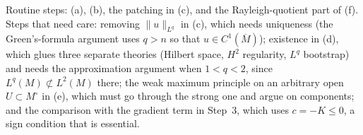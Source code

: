 \documentclass[11pt]{article}
\theoremstyle{plain}
\theoremstyle{definition}
\theoremstyle{remark}
\begin{document}
Routine steps: (a), (b), the patching in (c), and the Rayleigh-quotient part of (f). Steps that need care: removing \(\|u\|_{L^q}\) in (c), which needs uniqueness (the Green's-formula argument uses \(q>n\) so that \(u\in C^1(\overline M)\)); existence in (d), which glues three separate theories (Hilbert space, \(H^2\) regularity, \(L^q\) bootstrap) and needs the approximation argument when \(1<q<2\), since \(L^q(M)\not\subset L^2(M)\) there; the weak maximum principle on an arbitrary open \(U\subset M^\circ\) in (e), which must go through the strong one and argue on components; and the comparison with the gradient term in Step~3, which uses \(c=-K\le 0\), a sign condition that is essential.



\end{document}
